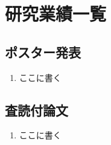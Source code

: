 \chapter*{研究業績一覧}

\section*{ポスター発表}

\begin{enumerate}
	\renewcommand{\labelenumi}{(\arabic{enumi})}
	\item ここに書く
\end{enumerate}

\section*{査読付論文}

\begin{enumerate}
	\renewcommand{\labelenumi}{(\arabic{enumi})}
	\item ここに書く
\end{enumerate}